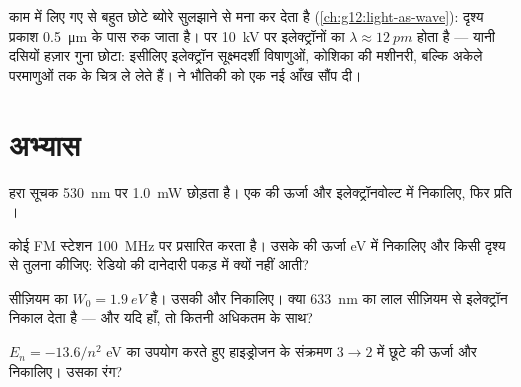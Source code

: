 \begin{example}[इलेक्ट्रॉन सूक्ष्मदर्शी]\label{ex:g12:quantum-world:microscope}
 काम में लिए गए  से बहुत छोटे ब्योरे
सुलझाने से मना कर देता है (\cref{ch:g12:light-as-wave}): दृश्य प्रकाश \qty{0.5}{\micro m} के पास रुक जाता है।
पर \qty{10}{kV} पर इलेक्ट्रॉनों का $\lambda \approx \qty{12}{pm}$ होता है --- यानी दसियों हज़ार गुना छोटा:
इसीलिए इलेक्ट्रॉन सूक्ष्मदर्शी विषाणुओं, कोशिका की मशीनरी, बल्कि अकेले
परमाणुओं तक के चित्र ले लेते हैं।  ने भौतिकी को
एक नई आँख सौंप दी।
\end{example}

\section{अभ्यास}

\begin{exercise}[$\star$]\label{exo:g12:quantum-world:1}
हरा  सूचक \qty{530}{nm} पर \qty{1.0}{mW} छोड़ता है। एक  की
ऊर्जा  और इलेक्ट्रॉनवोल्ट में निकालिए, फिर प्रति 
।
\end{exercise}

\begin{exercise}[$\star$]\label{exo:g12:quantum-world:2}
कोई FM स्टेशन \qty{100}{MHz} पर प्रसारित करता है। उसके  की
ऊर्जा \unit{eV} में निकालिए और किसी दृश्य  से तुलना
कीजिए: रेडियो की दानेदारी पकड़ में क्यों नहीं आती?
\end{exercise}

\begin{exercise}[$\star$]\label{exo:g12:quantum-world:3}
सीज़ियम का $W_0 = \qty{1.9}{eV}$ है। उसकी  और 
निकालिए। क्या \qty{633}{nm} का लाल  सीज़ियम से इलेक्ट्रॉन निकाल देता
है --- और यदि हाँ, तो कितनी अधिकतम  के साथ?
\end{exercise}

\begin{exercise}[$\star$]\label{exo:g12:quantum-world:4}
$E_n = -13.6/n^2$ \unit{eV} का उपयोग करते हुए हाइड्रोजन के संक्रमण $3 \to 2$ में छूटे
 की ऊर्जा और  निकालिए। उसका रंग?
\end{exercise}

